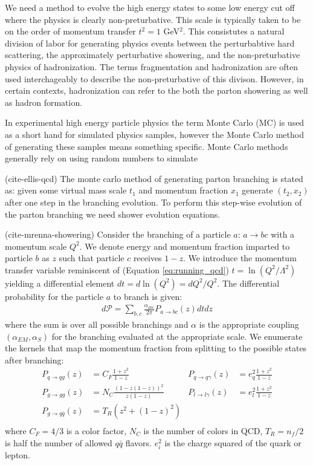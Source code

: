 We need a method to evolve the high energy states to some low energy cut off where the physics is clearly non-preturbative. 
This scale is typically taken to be on the order of momentum transfer $t^2 = 1$ GeV$^2$.
This consistutes a natural division of labor for generating physics events between the perturbabtive hard scattering, the approximately perturbative showering, and the non-preturbative physics of hadronization. The terms fragmentation and hadronization are often used interchageably to describe the non-preturbative of this divison. However, in certain contexts, hadronization can refer to the both the parton showering as well as hadron formation. 

In experimental high energy particle physics the term Monte Carlo (MC) is used as a short hand for simulated 
physics samples, however the Monte Carlo method of generating
these samples means something specific. Monte Carlo methods generally rely on using random numbers to simulate 

 
(cite-ellis-qcd) The monte carlo method of generating parton branching is stated as: given some 
virtual mass scale $t_1$ and momentum fraction $x_1$ generate
 $(t_2, x_2)$ after one step in the branching evolution. To perform this step-wise evolution of the parton 
branching we need shower evolution equations.

(cite-mrenna-showering) Consider the branching of a particle $a$:  $a\rightarrow bc$ with a 
momentum scale $Q^2$. We denote energy and momentum fraction imparted to particle $b$ as $z$
 such that particle $c$ receives $1-z$. We introduce the momentum
transfer variable reminiscent of (Equation \ref{eq:running_qcd}) $t = \ln (Q^2 / \Lambda^2)$ yielding 
a differential element $dt = d\ln (Q^2) = dQ^2/Q^2$. The
differential probability for the particle $a$ to branch is given:
\begin{align*}
d\mathcal{P} = \sum_{b,c} \frac{\alpha_{abc}}{2\pi} P_{a \rightarrow bc}(z) dt dz 
\end{align*}
where the sum is over all possible branchings and $\alpha$ is the appropriate 
coupling $(\alpha_{EM},\alpha_{S})$  for the branching evaluated at the appropriate scale. We enumerate the kernels that map the momentum fraction from splitting
 to the possible states after branching:
\begin{align*}
P_{q\rightarrow qg} (z) &= C_F\frac{1+z^2}{1-z}   &P_{q\rightarrow q\gamma} (z) &= e_q^2\frac{1+z^2}{1-z}\\
P_{g\rightarrow gg} (z) &= N_C\frac{(1-z(1-z))^2}{z(1-z)} &P_{l\rightarrow l\gamma} (z) &= e_l^2\frac{1+z^2}{1-z} \\ 
P_{g\rightarrow q\bar{q}} (z) &= T_R (z^2 + (1-z)^2)\\
\end{align*}
where $C_F=4/3$ is a color factor, $N_C$ is the number of colors in QCD, $T_R = n_f / 2$ is half the number 
of allowed $q\bar{q}$ flavors. $e_i^2$ is the charge squared of the quark or lepton. 


